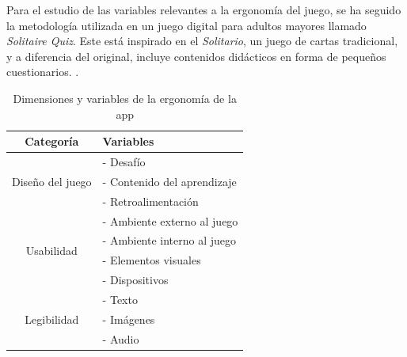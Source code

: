 Para el estudio de las variables relevantes a la ergonomía del juego, se ha seguido la metodología utilizada en un juego digital para adultos mayores llamado \textit{Solitaire Quiz}. Este está inspirado en el \textit{Solitario}, un juego de cartas tradicional, y a diferencia del original, incluye contenidos didácticos en forma de pequeños cuestionarios. \parencite{diseño2017}.

\begin{table}[H]
	\centering
	\begin{tabular}{|c|p{6cm}|}
		\hline
		\rowcolor{lightgray}
		\textbf{Categoría} & \textbf{Variables}\\
		\hline
		\multirow{3}{*}{Diseño del juego} & - Desafío \\
		& - Contenido del aprendizaje \\
		& - Retroalimentación \\
		\hline
		\multirow{4}{*}{Usabilidad} & - Ambiente externo al juego \\
		& - Ambiente interno al juego \\
		& - Elementos visuales \\
		& - Dispositivos \\
		\hline
		\multirow{3}{*}{Legibilidad} & - Texto \\
		& - Imágenes \\
		& - Audio \\
		\hline
	\end{tabular}
	\caption{Dimensiones y variables de la ergonomía de la app}
	\label{tab:usabilidad}
\end{table}



